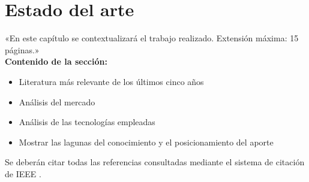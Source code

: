 \chapter{Estado del arte}
«En este capítulo se contextualizará el trabajo realizado. Extensión máxima: 15 páginas.»\\

\textbf{Contenido de la sección:}
\begin{itemize}
    \item Literatura más relevante de los últimos cinco años
    \item Análisis del mercado
    \item Análisis de las tecnologías empleadas
    \item Mostrar las lagunas del conocimiento y el posicionamiento del aporte
\end{itemize}

Se deberán citar todas las referencias consultadas mediante el sistema de citación de IEEE \cite{sistema_citado_ieee}.

